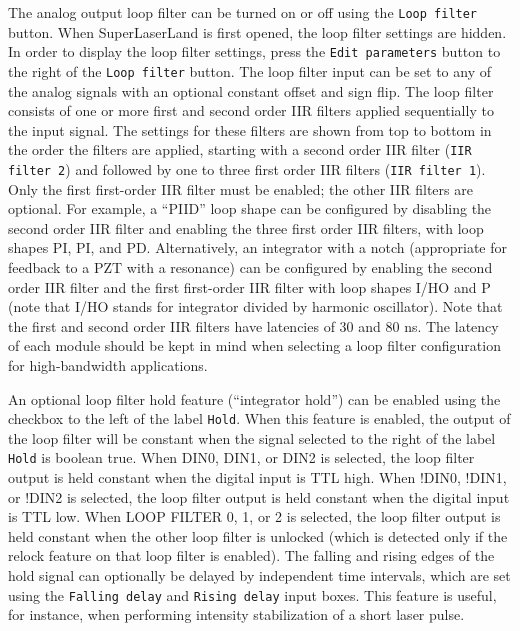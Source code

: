 \documentclass[aip,rsi,preprint,graphicx]{revtex4-1}
\begin{document}
The analog output loop filter can be turned on or off using the {\tt Loop filter} button.  When SuperLaserLand is first opened, the loop filter settings are hidden.  In order to display the loop filter settings, press the {\tt Edit parameters} button to the right of the {\tt Loop filter} button.  The loop filter input can be set to any of the analog signals with an optional constant offset and sign flip.  The loop filter consists of one or more first and second order IIR filters applied sequentially to the input signal.  The settings for these filters are shown from top to bottom in the order the filters are applied, starting with a second order IIR filter ({\tt IIR filter 2}) and followed by one to three first order IIR filters ({\tt IIR filter 1}).  Only the first first-order IIR filter must be enabled; the other IIR filters are optional.  For example, a ``PIID'' loop shape can be configured by disabling the second order IIR filter and enabling the three first order IIR filters, with loop shapes PI, PI, and PD.  Alternatively, an integrator with a notch (appropriate for feedback to a PZT with a resonance) can be configured by enabling the second order IIR filter and the first first-order IIR filter with loop shapes I/HO and P (note that I/HO stands for integrator divided by harmonic oscillator).  Note that the first and second order IIR filters have latencies of 30 and 80 ns.  The latency of each module should be kept in mind when selecting a loop filter configuration for high-bandwidth applications.

An optional loop filter hold feature (``integrator hold'') can be enabled using the checkbox to the left of the label {\tt Hold}.  When this feature is enabled, the output of the loop filter will be constant when the signal selected to the right of the label {\tt Hold} is boolean true.  When DIN0, DIN1, or DIN2 is selected, the loop filter output is held constant when the digital input is TTL high.  When !DIN0, !DIN1, or !DIN2 is selected, the loop filter output is held constant when the digital input is TTL low.  When LOOP FILTER 0, 1, or 2 is selected, the loop filter output is held constant when the other loop filter is unlocked (which is detected only if the relock feature on that loop filter is enabled).  The falling and rising edges of the hold signal can optionally be delayed by independent time intervals, which are set using the {\tt Falling delay} and {\tt Rising delay} input boxes.  This feature is useful, for instance, when performing intensity stabilization of a short laser pulse.
\end{document}
